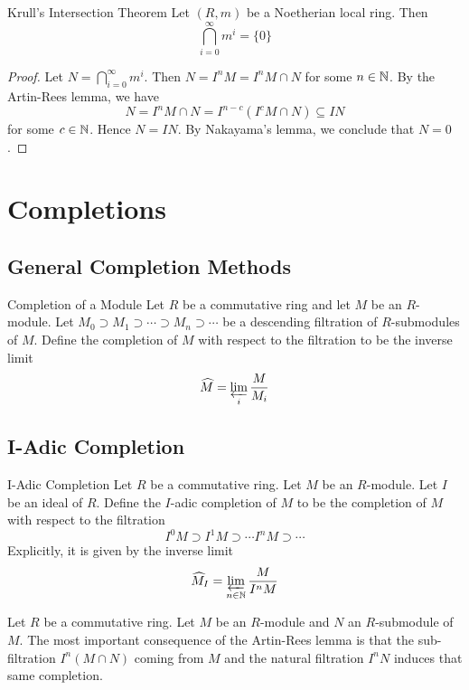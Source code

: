 \documentclass[a4paper]{article}
\begin{document}
\begin{thm}{Krull's Intersection Theorem}{} Let $(R,m)$ be a Noetherian local ring. Then $$\bigcap_{i=0}^\infty m^i=\{0\}$$ \tcbline
\begin{proof}
Let $N=\bigcap_{i=0}^\infty m^i$. Then $N=I^nM=I^nM\cap N$ for some $n\in\mathbb{N}$. By the Artin-Rees lemma, we have $$N=I^nM\cap N=I^{n-c}(I^cM\cap N)\subseteq IN$$ for some $c\in\mathbb{N}$. Hence $N=IN$. By Nakayama's lemma, we conclude that $N=0$. 
\end{proof}
\end{thm}

\pagebreak
\section{Completions}

\subsection{General Completion Methods}
\begin{defn}{Completion of a Module}{} Let $R$ be a commutative ring and let $M$ be an $R$-module. Let $M_0\supset M_1\supset\cdots\supset M_n\supset\cdots$ be a descending filtration of $R$-submodules of $M$. Define the completion of $M$ with respect to the filtration to be the inverse limit $$\widehat{M}=\varprojlim_i\frac{M}{M_i}$$
\end{defn}

\subsection{I-Adic Completion}
\begin{defn}{I-Adic Completion}{} Let $R$ be a commutative ring. Let $M$ be an $R$-module. Let $I$ be an ideal of $R$. Define the $I$-adic completion of $M$ to be the completion of $M$ with respect to the filtration $$I^0M\supset I^1M\supset\cdots I^nM\supset\cdots$$ Explicitly, it is given by the inverse limit $$\widehat{M}_I=\varprojlim_{n\in\mathbb{N}}\frac{M}{I^nM}$$
\end{defn}

Let $R$ be a commutative ring. Let $M$ be an $R$-module and $N$ an $R$-submodule of $M$. The most important consequence of the Artin-Rees lemma is that the sub-filtration $I^n(M\cap N)$ coming from $M$ and the natural filtration $I^nN$ induces that same completion. 
\end{document}
